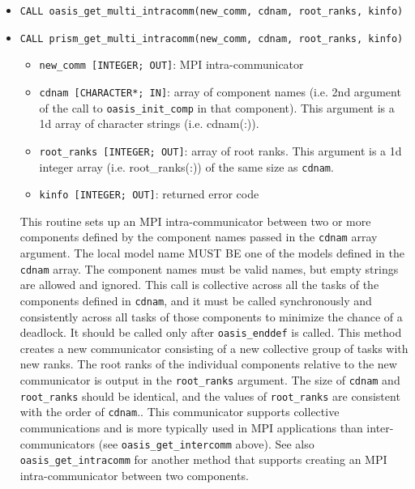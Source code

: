 \begin{itemize}
  This routine sets up an MPI intra-communicator between two 
  components, the local component and the component defined by
  the string {\tt cdnam}.  This call is collective
  across the tasks of the two components creating the intra-communicator only,
  and it must be called synchronously across all tasks of the two components
  to minimize the chance of a deadlock.  It should be called only after
  {\tt oasis\_enddef} is called.
  This method creates a new communicator consisting of a new collective group
  of tasks with new ranks.
  This communicator supports collective communications and is
  more typically used in MPI applications than inter-communicators
  (see {\tt oasis\_get\_intercomm} above).
  See also {\tt oasis\_get\_multi\_intracomm} for another method that
  supports creating an MPI intra-communicator between two or more components.

  \vspace{0.2cm}
\item {\tt CALL oasis\_get\_multi\_intracomm(new\_comm, cdnam, root\_ranks, kinfo)}
\item {\tt CALL prism\_get\_multi\_intracomm(new\_comm, cdnam, root\_ranks, kinfo)}
  \begin{itemize}
  \item {\tt new\_comm [INTEGER; OUT]}: MPI intra-communicator
  \item {\tt cdnam [CHARACTER*; IN]}: array of component names (i.e. 2nd argument of the call to {\tt oasis\_init\_comp} in that component).  This argument is a 1d array of character strings (i.e. cdnam(:)).
  \item {\tt root\_ranks [INTEGER; OUT]}: array of root ranks.  This argument is a 1d integer array (i.e. root\_ranks(:)) of the same size as {\tt cdnam}.
  \item {\tt kinfo [INTEGER; OUT]}: returned error code
  \end{itemize}

  This routine sets up an MPI intra-communicator between two or more
  components defined by the component names passed in the {\tt cdnam} array
  argument.  The local model name MUST BE one of the
  models defined in the {\tt cdnam} array.  The component names must 
  be valid names, but empty strings are allowed and ignored.
  This call is collective
  across all the tasks of the components defined in {\tt cdnam},
  and it must be called synchronously and consistently across all tasks of
  those components to minimize the chance of a deadlock.  It should be called only after
  {\tt oasis\_enddef} is called.
  This method creates a new communicator consisting of a new collective group
  of tasks with new ranks.  The root ranks of the individual components relative
  to the new communicator is output in the {\tt root\_ranks} argument.
  The size of {\tt cdnam} and {\tt root\_ranks} should be identical,
  and the values of {\tt root\_ranks} are consistent with the order of {\tt cdnam}..
  This communicator supports collective communications and is
  more typically used in MPI applications than inter-communicators
  (see {\tt oasis\_get\_intercomm} above).  
  See also {\tt oasis\_get\_intracomm} for another method that
  supports creating an MPI intra-communicator between two components.


\end{itemize}
